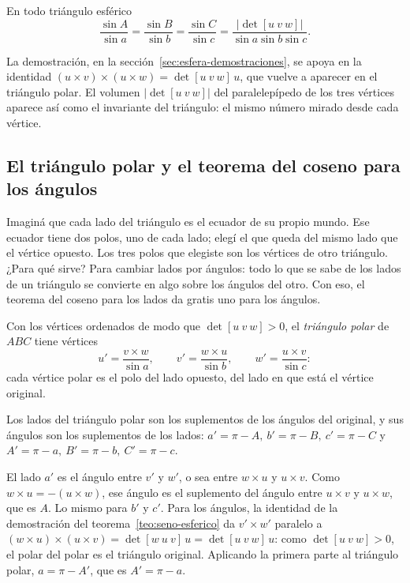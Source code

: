 \begin{teorema}\label{teo:seno-esferico}
En todo triángulo esférico
\[
  \frac{\sin A}{\sin a}=\frac{\sin B}{\sin b}=\frac{\sin C}{\sin c}
  =\frac{|\det[u\ v\ w]|}{\sin a\sin b\sin c}.
\]
\end{teorema}

La demostración, en la sección~\ref{sec:esfera-demostraciones}, se apoya en la identidad
\((u\times v)\times(u\times w)=\det[u\ v\ w]\,u\), que vuelve a aparecer en el triángulo
polar. El volumen \(|\det[u\ v\ w]|\) del paralelepípedo de los tres vértices aparece así como
el invariante del triángulo: el mismo número mirado desde cada vértice.

\subsection{El triángulo polar y el teorema del coseno para los ángulos}

Imaginá que cada lado del triángulo es el ecuador de su propio mundo. Ese ecuador tiene dos
polos, uno de cada lado; elegí el que queda del mismo lado que el vértice opuesto. Los tres
polos que elegiste son los vértices de otro triángulo. ¿Para qué sirve? Para cambiar lados por
ángulos: todo lo que se sabe de los lados de un triángulo se convierte en algo sobre los
ángulos del otro. Con eso, el teorema del coseno para los lados da gratis uno para los ángulos.

\begin{definicion}
Con los vértices ordenados de modo que \(\det[u\ v\ w]>0\), el \emph{triángulo polar} de
\(ABC\) tiene vértices
\[
  u'=\frac{v\times w}{\sin a},\qquad v'=\frac{w\times u}{\sin b},\qquad w'=\frac{u\times v}{\sin c}:
\]
cada vértice polar es el polo del lado opuesto, del lado en que está el vértice original.
\end{definicion}

\begin{proposicion}\label{prop:polar}
Los lados del triángulo polar son los suplementos de los ángulos del original, y sus ángulos
son los suplementos de los lados:
\(a'=\pi-A,\ b'=\pi-B,\ c'=\pi-C\) y \(A'=\pi-a,\ B'=\pi-b,\ C'=\pi-c\).
\end{proposicion}

\begin{demostracion}
El lado \(a'\) es el ángulo entre \(v'\) y \(w'\), o sea entre \(w\times u\) y
\(u\times v\). Como \(w\times u=-(u\times w)\), ese ángulo es el suplemento del ángulo entre
\(u\times v\) y \(u\times w\), que es \(A\). Lo mismo para \(b'\) y \(c'\). Para los ángulos,
la identidad de la demostración del teorema~\ref{teo:seno-esferico} da
\(v'\times w'\) paralelo a \((w\times u)\times(u\times v)=\det[w\ u\ v]\,u=\det[u\ v\ w]\,u\):
como \(\det[u\ v\ w]>0\), el polar del polar es el triángulo original. Aplicando la primera parte al triángulo polar,
\(a=\pi-A'\), que es \(A'=\pi-a\).
\end{demostracion}

